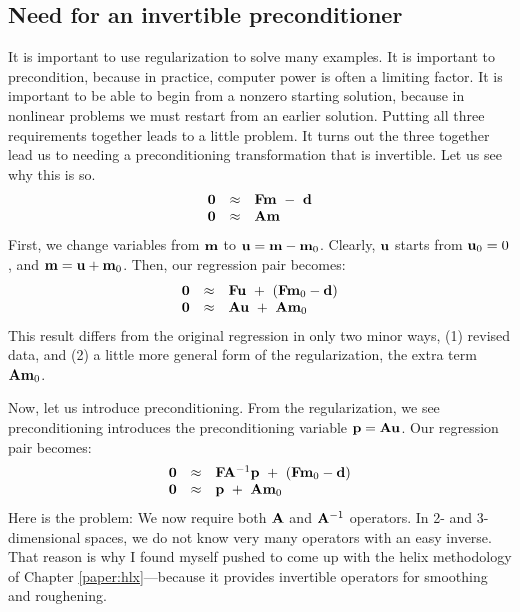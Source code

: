 \subsection{Need for an invertible preconditioner}
It is important to use regularization to solve many examples.
It is important to precondition,
because in practice,
computer power is often a limiting factor.
It is important to be able to begin from a nonzero starting solution,
because in nonlinear problems we must restart from an earlier solution.
Putting all three requirements together leads to a little problem.
It turns out the three together lead us to needing 
a preconditioning transformation that is invertible.
Let us see why this is so.
\begin{equation}
\begin{array}{lll}
\label{eq:main2}
\bold 0 &\approx & \bold F \bold m \ -\  \bold d \\
\bold 0 &\approx & \bold A \bold m
\end{array}
\end{equation}
First,
we change variables from $\bold m$ to $\bold u = \bold m - \bold m_0$.
Clearly,
$\bold u$ starts from $\bold u_0=0$, and $\bold m = \bold u + \bold m_0$.
Then,
our regression pair becomes:
\begin{equation}
\begin{array}{lll}
\label{eq:main3}
\bold 0 &\approx & \bold F \bold u \ +\  (\bold F\bold m_0 -\bold d) \\
\bold 0 &\approx & \bold A \bold u \ +\  \bold A \bold m_0
\end{array}
\end{equation}
This result differs from the original regression in only two minor ways,
(1) revised data, and (2) a little more general form of the regularization,
the extra term $\bold A \bold m_0$.
\par
Now,
let us introduce preconditioning.
From the regularization,
we see preconditioning introduces the preconditioning variable $\bold p = \bold A\bold u$.
Our regression pair becomes:
\begin{equation}
\begin{array}{lll}
\label{eq:main4}
\bold 0 &\approx & \bold F \bold A^{-1} \bold p \ +\  (\bold F\bold m_0 -\bold d) \\
\bold 0 &\approx &                      \bold p \ +\  \bold A \bold m_0
\end{array}
\end{equation}
Here is the problem:
We now require both $\bold A$ and $\bold A^{-1}$ operators.
In 2- and 3-dimensional spaces, we do not know very many operators
with an easy inverse.
That reason is why I found myself pushed to come up with the helix methodology 
of Chapter \ref{paper:hlx}---because it provides invertible operators for
smoothing and roughening.



